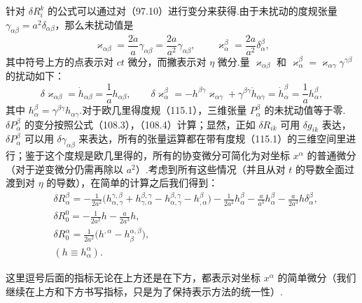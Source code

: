 针对 $\delta R_{i}^{k}$ 的公式可以通过对（97.10）进行变分来获得.由于未扰动的度规张量 $\gamma_{\alpha\beta}=a^{2}\delta_{\alpha\beta}$，那么未扰动值是
\begin{equation*}
  \varkappa_{\alpha\beta}=\frac{2\dot{a}}{a}\gamma_{\alpha\beta}
  =\frac{2a}{a^{2}}\gamma_{\alpha\beta},\qquad
  \varkappa_{\alpha}^{\beta}=\frac{2a}{a^{2}}\delta_{\alpha}^{\beta},
\end{equation*}
其中符号上方的点表示对 $ct$ 微分，而撇表示对 $\eta$ 微分.量 $\varkappa_{\alpha\beta}$ 和 $\varkappa_{\alpha}^{\beta}=\varkappa_{\alpha\gamma}\gamma^{\gamma\beta}$ 的扰动如下：
\begin{equation*}
  \delta\varkappa_{\alpha\beta}=\dot{h}_{\alpha\beta}=\frac{1}{a}h_{\alpha\beta},
  \qquad
  \delta\varkappa_{\alpha}^{\beta}
  =-h^{\beta\gamma}\varkappa_{\alpha\gamma}
  +\gamma^{\beta\gamma}\dot{h}_{\alpha\gamma}
  =\dot{h}_{\alpha}^{\beta}=\frac{1}{a}h_{\alpha}^{\beta},
\end{equation*}
其中 $h_{\alpha}^{\beta}=\gamma^{\beta\gamma}h_{\alpha\gamma}$.对于欧几里得度规（115.1），三维张量 $P_{\alpha}^{\beta}$ 的未扰动值等于零.$\delta P_{\alpha}^{\beta}$ 的变分按照公式（108.3），（108.4）计算；显然，正如 $\delta R_{ik}$ 可用 $\delta g_{ik}$ 表达，$\delta P_{\alpha}^{\beta}$ 可以用 $\delta\gamma_{\alpha\beta}$ 来表达，所有的张量运算都在带有度规（115.1）的三维空间里进行；鉴于这个度规是欧几里得的，所有的协变微分可简化为对坐标 $x^{\alpha}$ 的普通微分（对于逆变微分仍需再除以 $a^{2}$）.考虑到所有这些情况（并且从对 $t$ 的导数全面过渡到对 $\eta$ 的导数），在简单的计算之后我们得到：
\begin{equation}
  \begin{aligned}
    &\delta R_{\alpha}^{\beta}
    =-\frac{1}{2a^{2}}\bigl(h_{\alpha,\gamma}^{\gamma,\beta}
    +h_{\gamma,\alpha}^{\beta,\gamma}
    -h_{\alpha,\gamma}^{\beta,\gamma}
    -h_{,\alpha}^{\beta}\bigr)
    -\frac{1}{2a^{2}}h_{\alpha}^{\beta}
    -\frac{a}{a^{3}}h_{\alpha}^{\beta}
    -\frac{a}{2a^{3}}h\delta_{\alpha}^{\beta},\\
    &\delta R_{0}^{0}=-\frac{1}{2a^{2}}h
    -\frac{a}{2a^{3}}h,\\
    &\delta R_{0}^{\alpha}
    =\frac{1}{2a^{2}}\bigl(h^{,\alpha}-h_{\beta}^{\alpha,\beta}\bigr),\\
    &(h\equiv h_{\alpha}^{\alpha}).
  \end{aligned}
\end{equation}

这里逗号后面的指标无论在上方还是在下方，都表示对坐标 $x^{\alpha}$ 的简单微分（我们继续在上方和下方书写指标，只是为了保持表示方法的统一性）.

